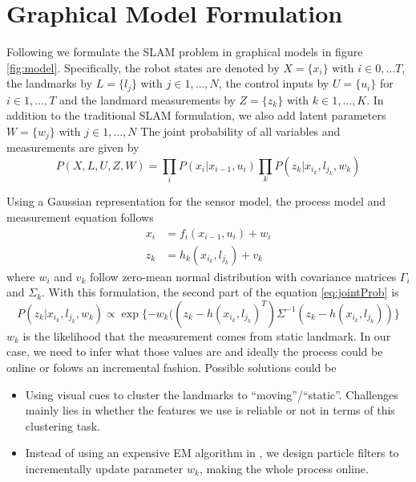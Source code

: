 \section{Graphical Model Formulation}
Following \cite{isam} we formulate the SLAM problem in graphical models in figure \ref{fig:model}. Specifically, the robot states are denoted by $X = \{x_i\}$ with $i \in 0, \dots T$, the landmarks by $L = \{l_j\}$ with $j \in 1,\dots, N$, the control inputs by $U = \{u_i\}$ for $i \in 1,\dots, T$ and the landmard measurements by $Z = \{z_k\}$ with $k \in 1, \dots, K$. In addition to the traditional SLAM formulation, we also add latent parameters $W = \{w_j\}$ with $j \in 1, \dots, N$  The joint probability of all variables and measurements are given by
\begin{equation}
P(X, L, U, Z, W) = \prod\limits_{i}P(x_i|x_{i-1}, u_i)\prod\limits_{k}P(z_k|x_{i_k}, l_{j_k}, w_k)
\label{eq:jointProb}
\end{equation}


Using a Gaussian representation for the sensor model, the process model and measurement equation follows
\begin{equation}
\begin{aligned}
x_i &= f_i(x_{i-1}, u_i) + w_i \\
z_k &= h_k(x_{i_k}, l_{j_k}) + v_k
\end{aligned}
\end{equation}
where $w_i$ and $v_k$ follow zero-mean normal distribution with covariance matrices $\Gamma_i$ and $\Sigma_k$. With this formulation, the second part of the equation \ref{eq:jointProb} is
\begin{equation}
P(z_k|x_{i_k}, l_{j_k}, w_k)\propto \exp\{-w_k((z_k - h(x_{i_k}, l_{j_k})^T)\Sigma^{-1}(z_k - h(x_{i_k}, l_{j_k}))\}
\label{eq:sensor}
\end{equation}
$w_k$ is the likelihood that the measurement comes from static landmark. In our case, we need to infer what those values are and ideally the process could be online or folows an incremental fashion. Possible solutions could be
\begin{itemize}
\item Using visual cues to cluster the landmarks to ``moving''/``static''. Challenges mainly lies in whether the features we use is reliable or not in terms of this clustering task.
\item Instead of using an expensive EM algorithm in \cite{rogers2010slam}, we design particle filters to incrementally update parameter $w_k$, making the whole process online.
\end{itemize}



